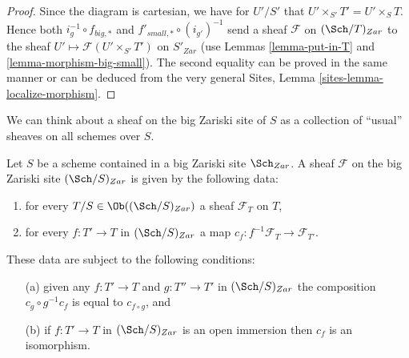 \begin{proof}
Since the diagram is cartesian, we have for $U'/S'$
that $U' \times_{S'} T' = U' \times_S T$. Hence both
$i_g^{-1} \circ f_{big, *}$ and $f'_{small, *} \circ (i_{g'})^{-1}$
send a sheaf $\mathcal{F}$ on $(\Sch/T)_{Zar}$ to the sheaf
$U' \mapsto \mathcal{F}(U' \times_{S'} T')$ on $S'_{Zar}$
(use Lemmas \ref{lemma-put-in-T} and \ref{lemma-morphism-big-small}).
The second equality can be proved in the same manner or can be
deduced from the very general
Sites, Lemma \ref{sites-lemma-localize-morphism}.
\end{proof}

\noindent
We can think about a sheaf on the big Zariski site of $S$ as a collection
of ``usual'' sheaves on all schemes over $S$.

\begin{lemma}
\label{lemma-characterize-sheaf-big}
Let $S$ be a scheme contained in a big Zariski site $\Sch_{Zar}$.
A sheaf $\mathcal{F}$ on the big Zariski site $(\Sch/S)_{Zar}$
is given by the following data:
\begin{enumerate}
\item for every $T/S \in \Ob((\Sch/S)_{Zar})$ a sheaf
$\mathcal{F}_T$ on $T$,
\item for every $f : T' \to T$ in
$(\Sch/S)_{Zar}$ a map
$c_f : f^{-1}\mathcal{F}_T \to \mathcal{F}_{T'}$.
\end{enumerate}
These data are subject to the following conditions:
\begin{enumerate}
\item[(a)] given any $f : T' \to T$ and $g : T'' \to T'$ in
$(\Sch/S)_{Zar}$ the composition $c_g \circ g^{-1}c_f$
is equal to $c_{f \circ g}$, and
\item[(b)] if $f : T' \to T$ in $(\Sch/S)_{Zar}$ is an
open immersion then $c_f$ is an isomorphism.
\end{enumerate}
\end{lemma}

